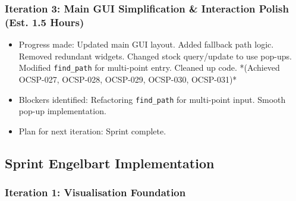 \subsubsection{Iteration 3: Main GUI Simplification \& Interaction Polish (Est. 1.5 Hours)}
\begin{itemize}
	\item Progress made: Updated main GUI layout. Added fallback path logic. Removed redundant widgets. Changed stock query/update to use pop-ups. Modified \verb|find_path| for multi-point entry. Cleaned up code. *(Achieved OCSP-027, OCSP-028, OCSP-029, OCSP-030, OCSP-031)*
	\item Blockers identified: Refactoring \verb|find_path| for multi-point input. Smooth pop-up implementation.
	\item Plan for next iteration: Sprint complete.
\end{itemize}

\clearpage
\subsection{Sprint Engelbart Implementation}

\subsubsection{Iteration 1: Visualisation Foundation}

